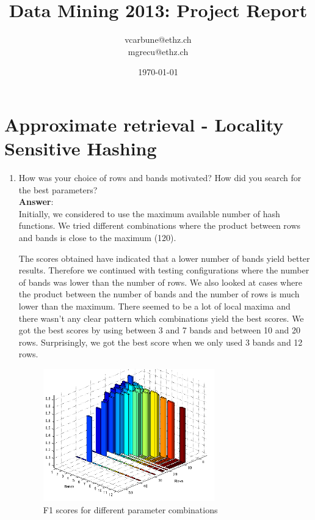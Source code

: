 \documentclass[11pt]{article}
\title{Data Mining 2013: Project Report}
\author{vcarbune@ethz.ch\\ mgrecu@ethz.ch}
\date{\today}
\begin{document}
\maketitle

\section{Approximate retrieval - Locality Sensitive Hashing}
\begin{enumerate}
\item How was your choice of rows and bands motivated? How did you search for the
best parameters? \\

\textbf{Answer}: \\
Initially, we considered to use the maximum available number of
hash functions. We tried different combinations where the product 
between rows and bands is close to the maximum (120).

The scores obtained have indicated that a lower number of bands yield
better results. Therefore we continued with testing configurations where 
the number of bands was lower than the number of rows. 
We also looked at cases where the product between the number of bands and
the number of rows is much lower than the maximum. 
There seemed to be a lot of local maxima and there wasn't any clear pattern 
which combinations yield the best scores. We got the best scores by using
between 3 and 7 bands and between 10 and 20 rows.
Surprisingly, we got the best score when we only used 3 bands and 12 rows.


\begin{figure}[h!b]
\centering
\includegraphics[width=0.7\textwidth]{lsh.png}
\caption{F1 scores for different parameter combinations}
\label{fig:lsh_chart}
\end{figure}



\end{enumerate}
\end{document}
